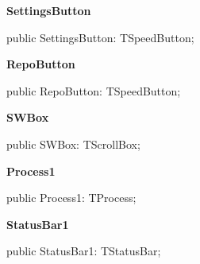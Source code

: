 \documentclass{report}
\newif\ifpdf
\begin{document}
\begin{list}{}
\par  \label{manager.TMnFrm-SettingsButton}
\item[\textbf{SettingsButton}\hfill]
\ifpdf
\begin{flushleft}
\fi
\begin{ttfamily}
public SettingsButton: TSpeedButton;\end{ttfamily}

\ifpdf
\end{flushleft}
\fi


\par  \label{manager.TMnFrm-RepoButton}
\item[\textbf{RepoButton}\hfill]
\ifpdf
\begin{flushleft}
\fi
\begin{ttfamily}
public RepoButton: TSpeedButton;\end{ttfamily}

\ifpdf
\end{flushleft}
\fi


\par  \label{manager.TMnFrm-SWBox}
\item[\textbf{SWBox}\hfill]
\ifpdf
\begin{flushleft}
\fi
\begin{ttfamily}
public SWBox: TScrollBox;\end{ttfamily}

\ifpdf
\end{flushleft}
\fi


\par  \label{manager.TMnFrm-Process1}
\item[\textbf{Process1}\hfill]
\ifpdf
\begin{flushleft}
\fi
\begin{ttfamily}
public Process1: TProcess;\end{ttfamily}

\ifpdf
\end{flushleft}
\fi


\par  \label{manager.TMnFrm-StatusBar1}
\item[\textbf{StatusBar1}\hfill]
\ifpdf
\begin{flushleft}
\fi
\begin{ttfamily}
public StatusBar1: TStatusBar;\end{ttfamily}

\ifpdf
\end{flushleft}
\fi



\end{list}
\end{document}
